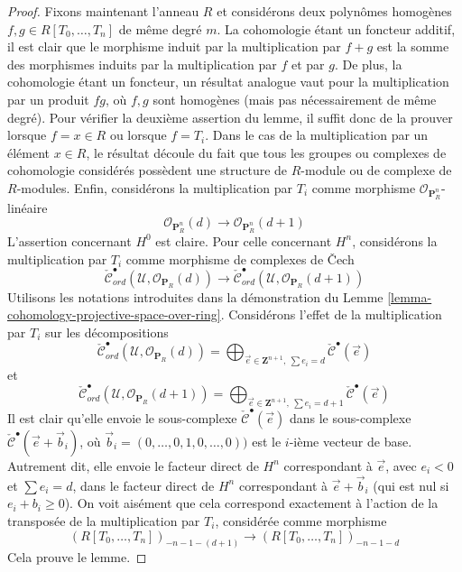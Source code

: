 \begin{proof}
\medskip\noindent
Fixons maintenant l'anneau $R$ et considérons deux polynômes homogènes
$f, g \in R[T_0, \ldots, T_n]$ de même degré $m$.
La cohomologie étant un foncteur additif, il est clair que le
morphisme induit par la multiplication par $f + g$ est la somme
des morphismes induits par la multiplication par $f$ et
par $g$. De plus, la cohomologie étant un foncteur,
un résultat analogue vaut pour la multiplication par un produit $fg$, où
$f, g$ sont homogènes (mais pas nécessairement de même degré).
Pour vérifier la deuxième assertion du lemme, il suffit donc de
la prouver lorsque $f = x \in R$ ou lorsque $f = T_i$.
Dans le cas de la multiplication par un élément $x \in R$, le résultat
découle du fait que tous les groupes ou complexes de cohomologie considérés possèdent
une structure de $R$-module ou de complexe de $R$-modules.
Enfin, considérons la multiplication par $T_i$
comme morphisme $\mathcal{O}_{\mathbf{P}^n_R}$-linéaire
$$
\mathcal{O}_{\mathbf{P}^n_R}(d)
\longrightarrow
\mathcal{O}_{\mathbf{P}^n_R}(d + 1)
$$
L'assertion concernant $H^0$ est claire. Pour celle concernant $H^n$,
considérons la multiplication par $T_i$ comme morphisme de complexes de {\v C}ech
$$
\check{\mathcal{C}}_{ord}^\bullet(\mathcal{U},
\mathcal{O}_{\mathbf{P}_R}(d))
\longrightarrow
\check{\mathcal{C}}_{ord}^\bullet(\mathcal{U},
\mathcal{O}_{\mathbf{P}_R}(d + 1))
$$
Utilisons les notations introduites dans la démonstration du
Lemme \ref{lemma-cohomology-projective-space-over-ring}.
Considérons l'effet de la multiplication par $T_i$
sur les décompositions
$$
\check{\mathcal{C}}_{ord}^\bullet(\mathcal{U}, \mathcal{O}_{\mathbf{P}_R}(d))
=
\bigoplus\nolimits_{\vec{e} \in \mathbf{Z}^{n + 1}, \ \sum e_i = d}
\check{\mathcal{C}}^\bullet(\vec{e})
$$
et
$$
\check{\mathcal{C}}_{ord}^\bullet(\mathcal{U},
\mathcal{O}_{\mathbf{P}_R}(d + 1))
=
\bigoplus\nolimits_{\vec{e} \in \mathbf{Z}^{n + 1}, \ \sum e_i = d + 1}
\check{\mathcal{C}}^\bullet(\vec{e})
$$
Il est clair qu'elle envoie le sous-complexe
$\check{\mathcal{C}}^\bullet(\vec{e})$ dans le sous-complexe
$\check{\mathcal{C}}^\bullet(\vec{e} + \vec{b}_i)$, où
$\vec{b}_i = (0, \ldots, 0, 1, 0, \ldots, 0))$ est le $i$-ième vecteur de base.
Autrement dit, elle envoie le facteur direct de $H^n$ correspondant à
$\vec{e}$, avec $e_i < 0$ et $\sum e_i = d$,
dans le facteur direct de $H^n$ correspondant à
$\vec{e} + \vec{b}_i$ (qui est nul si $e_i + b_i \geq 0$).
On voit aisément que cela correspond exactement à l'action
de la transposée de la multiplication par $T_i$, considérée comme morphisme
$$
(R[T_0, \ldots, T_n])_{-n - 1 - (d + 1)}
\longrightarrow
(R[T_0, \ldots, T_n])_{-n - 1 - d}
$$
Cela prouve le lemme.
\end{proof}

